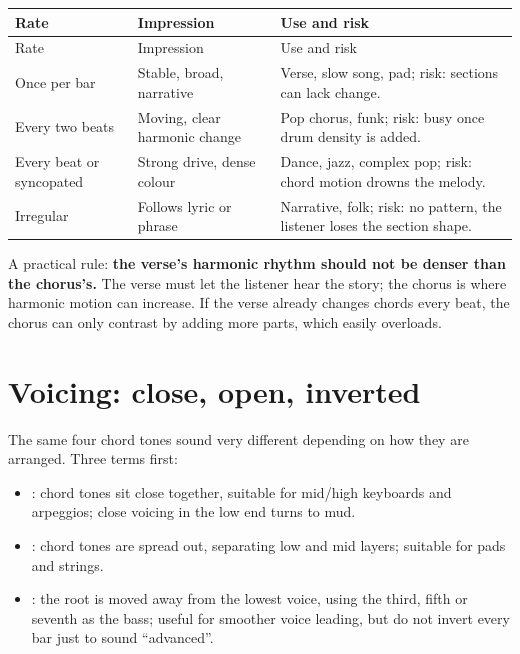 \begin{longtable}{p{}p{}p{}}
\toprule
Rate & Impression & Use and risk \\
\midrule
\endfirsthead
\toprule
Rate & Impression & Use and risk \\
\midrule
\endhead
Once per bar & Stable, broad, narrative & Verse, slow song, pad; risk: sections can lack change. \\
Every two beats & Moving, clear harmonic change & Pop chorus, funk; risk: busy once drum density is added. \\
Every beat or syncopated & Strong drive, dense colour & Dance, jazz, complex pop; risk: chord motion drowns the melody. \\
Irregular & Follows lyric or phrase & Narrative, folk; risk: no pattern, the listener loses the section shape. \\
\bottomrule
\end{longtable}

A practical rule: \textbf{the verse's harmonic rhythm should not be denser than the chorus's.} The verse must let the listener hear the story; the chorus is where harmonic motion can increase. If the verse already changes chords every beat, the chorus can only contrast by adding more parts, which easily overloads.

\section{Voicing: close, open, inverted}
\label{sec:voicing}

The same four chord tones sound very different depending on how they are arranged. Three terms first:

\begin{itemize}
\item \textbf{}: chord tones sit close together, suitable for mid/high keyboards and arpeggios; close voicing in the low end turns to mud.
\item \textbf{}: chord tones are spread out, separating low and mid layers; suitable for pads and strings.
\item \textbf{}: the root is moved away from the lowest voice, using the third, fifth or seventh as the bass; useful for smoother voice leading, but do not invert every bar just to sound ``advanced''.
\end{itemize}

